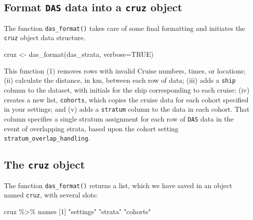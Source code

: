 \documentclass[
]{book}
\newenvironment{Shaded}{\begin{snugshade}}{\end{snugshade}}
\newcommand{\AttributeTok}[1]{\textcolor[rgb]{0.77,0.63,0.00}{#1}}
\newcommand{\ConstantTok}[1]{\textcolor[rgb]{0.00,0.00,0.00}{#1}}
\newcommand{\DecValTok}[1]{\textcolor[rgb]{0.00,0.00,0.81}{#1}}
\newcommand{\FunctionTok}[1]{\textcolor[rgb]{0.00,0.00,0.00}{#1}}
\newcommand{\NormalTok}[1]{#1}
\newcommand{\OtherTok}[1]{\textcolor[rgb]{0.56,0.35,0.01}{#1}}
\newcommand{\SpecialCharTok}[1]{\textcolor[rgb]{0.00,0.00,0.00}{#1}}
\newcommand{\StringTok}[1]{\textcolor[rgb]{0.31,0.60,0.02}{#1}}
\begin{document}
\hypertarget{format-das-data-into-a-cruz-object}{%
\subsection*{\texorpdfstring{Format \texttt{DAS} data into a \texttt{cruz} object}{Format DAS data into a cruz object}}\label{format-das-data-into-a-cruz-object}}

The function \texttt{das\_format()} takes care of some final formatting and initiates the \texttt{cruz} object data structure.

\begin{Shaded}
\begin{Highlighting}[]
\NormalTok{cruz }\OtherTok{\textless{}{-}} \FunctionTok{das\_format}\NormalTok{(das\_strata, }\AttributeTok{verbose=}\ConstantTok{TRUE}\NormalTok{)}
\end{Highlighting}
\end{Shaded}

This function (1) removes rows with invalid Cruise numbers, times, or locations; (ii) calculate the distance, in km, between each row of data; (iii) adds a \texttt{ship} column to the dataset, with initials for the ship corresponding to each cruise; (iv) creates a new list, \texttt{cohorts}, which copies the cruise data for each cohort specified in your settings; and (v) adds a \texttt{stratum} column to the data in each cohort. That column specifies
a single stratum assignment for each row of \texttt{DAS} data in the event of overlapping strata, based upon the cohort setting \texttt{stratum\_overlap\_handling}.

\hypertarget{the-cruz-object}{%
\subsection*{\texorpdfstring{The \texttt{cruz} object}{The cruz object}}\label{the-cruz-object}}

The function \texttt{das\_format()} returns a list, which we have saved in an object named \texttt{cruz}, with several slots:

\begin{Shaded}
\begin{Highlighting}[]
\NormalTok{cruz }\SpecialCharTok{\%\textgreater{}\%}\NormalTok{ names}
\NormalTok{[}\DecValTok{1}\NormalTok{] }\StringTok{"settings"} \StringTok{"strata"}   \StringTok{"cohorts"} 
\end{Highlighting}
\end{Shaded}
\end{document}
